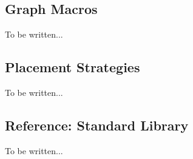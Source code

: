 



\subsection{Graph Macros}
\label{section-library-graphs-macros}

To be written...



\subsection{Placement Strategies}
\label{section-library-graphs-placement}

To be written...


\subsection{Reference: Standard Library}

To be written...

